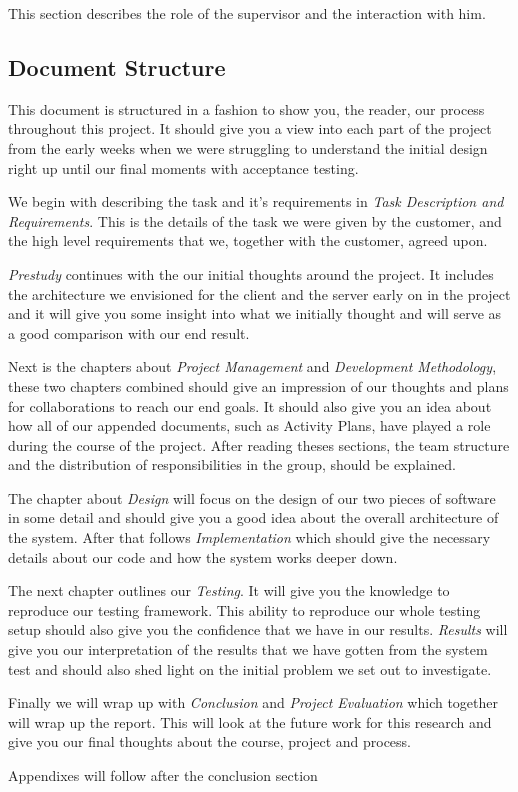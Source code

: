     This section describes the role of the supervisor and the interaction with him. 
    
    \subsection{Document Structure}\label{Document Structure}
    This document is structured in a fashion to show you, the reader, our process throughout this project. It should give you a view into each part of the project from the early weeks when we were struggling to understand the initial design right up until our final moments with acceptance testing. 
    
    We begin with describing the task and it's requirements in \emph{Task Description and Requirements}. This is the details of the task we were given by the customer, and the high level requirements that we, together with the customer, agreed upon.
    
    \emph{Prestudy} continues with the our initial thoughts around the project. It includes the architecture we envisioned for the client and the server early on in the project and it will give you some insight into what we initially thought and will serve as a good comparison with our end result.
    
    Next is the chapters about \emph{Project Management} and \emph{Development Methodology}, these two chapters combined should give an impression of our thoughts and plans for collaborations to reach our end goals. It should also give you an idea about how all of our appended documents, such as Activity Plans, have played a role during the course of the project. After reading theses sections, the team structure and the distribution of responsibilities in the group, should be explained.
    
    The chapter about \emph{Design} will focus on the design of our two pieces of software in some detail and should give you a good idea about the overall architecture of the system. After that follows \emph{Implementation} which should give the necessary details about our code and how the system works deeper down.
    
    The next chapter outlines our \emph{Testing}. It will give you the knowledge to reproduce our testing framework. This ability to reproduce our whole testing setup should also give you the confidence that we have in our results. \emph{Results} will give you our interpretation of the results that we have gotten from the system test and should also shed light on the initial problem we set out to investigate.
    
    Finally we will wrap up with \emph{Conclusion} and \emph{Project Evaluation} which together will wrap up the report. This will look at the future work for this research and give you our final thoughts about the course, project and process.
    
    Appendixes will follow after the conclusion section
    
    
